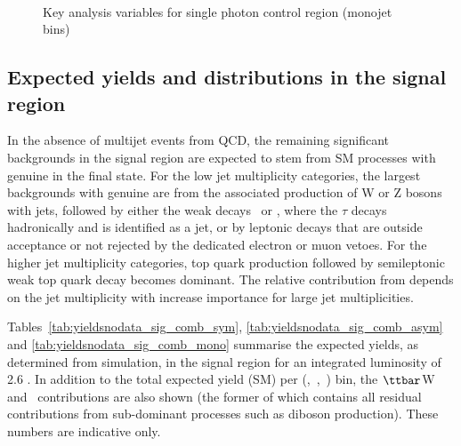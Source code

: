 \begin{figure}
\begin{center}
         \\
        \caption{Key analysis variables for single photon control region (monojet bins)}
        \label{fig:distribution_singlephoton_mono}
    \end{center}
\end{figure}

\clearpage
\subsection{Expected yields and distributions in the signal region}

In the absence of multijet events from QCD, the remaining significant
backgrounds in the signal region are expected to stem from SM
processes with genuine \met in the final state. For the low jet
multiplicity categories, the largest backgrounds with genuine \met are
from the associated production of W or Z bosons with jets, followed by
either the weak decays \znunu\ or \wtaunu, where the $\tau$ decays
hadronically and is identified as a jet, or by leptonic decays that
are outside acceptance or not rejected by the dedicated electron or
muon vetoes. For the higher jet multiplicity categories, top quark
production followed by semileptonic weak top quark decay becomes
dominant. The relative contribution from \ttbar depends on the jet
multiplicity with increase importance for large jet multiplicities.

Tables~\ref{tab:yieldsnodata_sig_comb_sym},
\ref{tab:yieldsnodata_sig_comb_asym} and \ref{tab:yieldsnodata_sig_comb_mono} 
summarise the expected yields, as
determined from simulation, in the signal region for an integrated
luminosity of 2.6 \ifb. In addition to the total expected yield (SM)
per (\njet,~\nb,~\scalht) bin, the $\ttbar$W and \znunu\ contributions
are also shown (the former of which contains all residual
contributions from sub-dominant processes such as \eg diboson
production). These numbers are indicative only.

